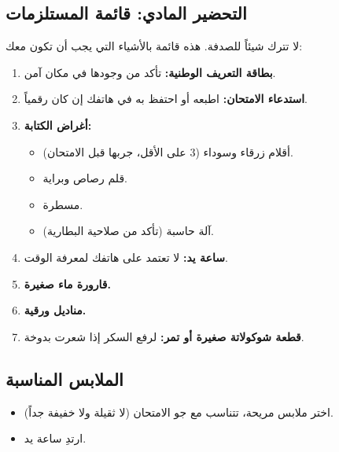 \documentclass[12pt,a4paper]{book}
\begin{document}
\subsection{التحضير المادي: قائمة المستلزمات}

لا تترك شيئاً للصدفة. هذه قائمة بالأشياء التي يجب أن تكون معك:

\begin{enumerate}
	\item \textbf{بطاقة التعريف الوطنية:} تأكد من وجودها في مكان آمن.
	\item \textbf{استدعاء الامتحان:} اطبعه أو احتفظ به في هاتفك إن كان رقمياً.
	\item \textbf{أغراض الكتابة:}
	\begin{itemize}
		\item أقلام زرقاء وسوداء (3 على الأقل، جربها قبل الامتحان).
		\item قلم رصاص وبراية.
		\item مسطرة.
		\item آلة حاسبة (تأكد من صلاحية البطارية).
	\end{itemize}
	\item \textbf{ساعة يد:} لا تعتمد على هاتفك لمعرفة الوقت.
	\item \textbf{قارورة ماء صغيرة.}
	\item \textbf{مناديل ورقية.}
	\item \textbf{قطعة شوكولاتة صغيرة أو تمر:} لرفع السكر إذا شعرت بدوخة.
\end{enumerate}

\subsection{الملابس المناسبة}
\begin{itemize}
	\item اختر ملابس مريحة، تتناسب مع جو الامتحان (لا ثقيلة ولا خفيفة جداً).
	\item ارتدِ ساعة يد.
\end{itemize}



\end{document}
